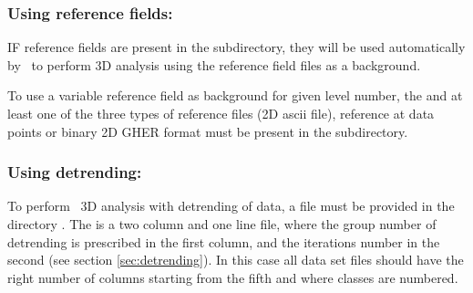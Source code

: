 \begin{center}
\end{center}


\subsubsection{ Using reference fields:}


IF reference fields are present in the  subdirectory, they will be used automatically by \diva\ to perform  3D analysis using the reference field files as a background.\par
To use a variable reference field as background for given level number, the  and at least one of the three types of reference files  (2D ascii file), reference at data points or  binary 2D GHER format must be present in the  subdirectory.



\begin{center}
\end{center}



\subsubsection{ Using detrending:}


To perform  \diva\ 3D analysis with detrending of data, a  file must be provided  in the directory . The   is a two column and one line file, where the group number of detrending is prescribed in the first column, and the iterations number in the second (see section \ref{sec:detrending}). In this case all data set files should have the right number of columns starting from the fifth and where classes are numbered.




